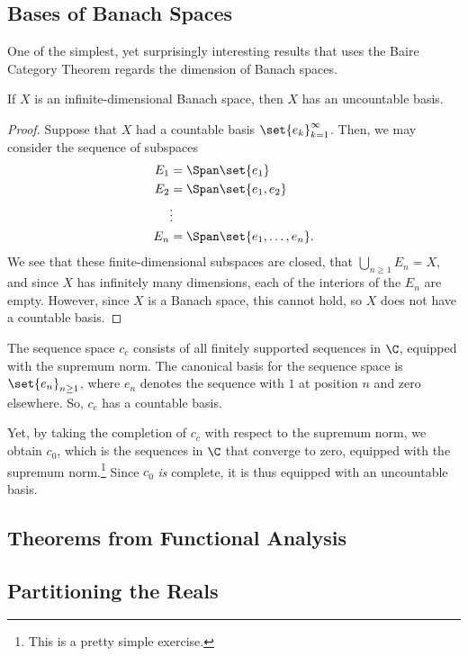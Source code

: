 \documentclass[10pt]{mypackage}
\begin{document}
\subsection{Bases of Banach Spaces}%
One of the simplest, yet surprisingly interesting results that uses the Baire Category Theorem regards the dimension of Banach spaces.
\begin{proposition}
  If $X$ is an infinite-dimensional Banach space, then $X$ has an uncountable basis.
\end{proposition}
\begin{proof}
  Suppose that $X$ had a countable basis $\set{e_k}_{k=1}^{\infty}$. Then, we may consider the sequence of subspaces
  \begin{align*}
    E_1 &= \Span\set{e_1}\\
    E_2 &= \Span\set{e_1,e_2}\\
        &\vdots\\
    E_{n} &= \Span\set{e_1,\dots,e_n}.
  \end{align*}
  We see that these finite-dimensional subspaces are closed, that $\bigcup_{n\geq 1}E_n = X$, and since $X$ has infinitely many dimensions, each of the interiors of the $E_n$ are empty. However, since $X$ is a Banach space, this cannot hold, so $X$ does not have a countable basis.
\end{proof}
\begin{example}
  The sequence space $c_c$ consists of all finitely supported sequences in $\C$, equipped with the supremum norm. The canonical basis for the sequence space is $\set{e_n}_{n\geq 1}$, where $e_n$ denotes the sequence with $1$ at position $n$ and zero elsewhere. So, $c_c$ has a countable basis.\newline

  Yet, by taking the completion of $c_c$ with respect to the supremum norm, we obtain $c_0$, which is the sequences in $\C$ that converge to zero, equipped with the supremum norm.\footnote{This is a pretty simple exercise.} Since $c_0$ \textit{is} complete, it is thus equipped with an uncountable basis.
\end{example}
\subsection{Theorems from Functional Analysis}%
\subsection{Partitioning the Reals}%
\end{document}

